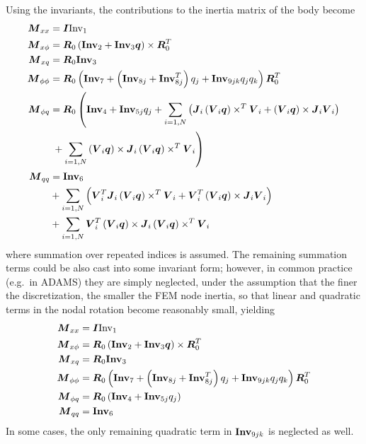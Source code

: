 Using the invariants, the contributions to the inertia matrix of the body
become
\begin{align}
	\boldsymbol{M}_{xx}	&= \boldsymbol{I} \mathrm{Inv}_1 \\
	\boldsymbol{M}_{x\phi}	&= \boldsymbol{R}_0 \left( 
		\boldsymbol{\mathrm{Inv}}_2 + \boldsymbol{\mathrm{Inv}}_3 \boldsymbol{q} \right)\times{}  \boldsymbol{R}_0^T \\
	\boldsymbol{M}_{xq}	&= \boldsymbol{R}_0 \boldsymbol{\mathrm{Inv}}_3 \\
	\boldsymbol{M}_{\phi\phi}&= \boldsymbol{R}_0 \left( 
		\boldsymbol{\mathrm{Inv}}_7
		+ \left( \boldsymbol{\mathrm{Inv}}_{8j} + \boldsymbol{\mathrm{Inv}}_{8j}^T \right) q_j
		+ \boldsymbol{\mathrm{Inv}}_{9jk} q_j q_k
	 \right) \boldsymbol{R}_0^T \\
	\boldsymbol{M}_{\phi q}	&= \boldsymbol{R}_0 \left( 
		\boldsymbol{\mathrm{Inv}}_4
		+ \boldsymbol{\mathrm{Inv}}_{5j} q_j 
		+ \sum_{i=1,N} \left( 
			\boldsymbol{J}_i \left( \boldsymbol{V}_i \boldsymbol{q} \right)\times^T \boldsymbol{V}_i
			+ \left( \boldsymbol{V}_i \boldsymbol{q} \right)\times \boldsymbol{J}_i \boldsymbol{V}_i
		 \right)
	 \right. \nonumber \\
			& \left.  \mbox{} + \sum_{i=1,N} \left( \boldsymbol{V}_i \boldsymbol{q} \right)\times \boldsymbol{J}_i \left( \boldsymbol{V}_i \boldsymbol{q} \right)\times^T \boldsymbol{V}_i
	 \right) \\
	\boldsymbol{M}_{qq}	&= \boldsymbol{\mathrm{Inv}}_6 \nonumber \\
			& \mbox{} + \sum_{i=1,N} \left( 
			\boldsymbol{V}_i^T \boldsymbol{J}_i \left( \boldsymbol{V}_i \boldsymbol{q} \right)\times^T \boldsymbol{V}_i
			+ \boldsymbol{V}_i^T \left( \boldsymbol{V}_i \boldsymbol{q} \right)\times \boldsymbol{J}_i \boldsymbol{V}_i
	 \right) \nonumber \\
			& \mbox{} + \sum_{i=1,N}
			\boldsymbol{V}_i^T \left( \boldsymbol{V}_i \boldsymbol{q} \right)\times \boldsymbol{J}_i \left( \boldsymbol{V}_i \boldsymbol{q} \right)\times^T \boldsymbol{V}_i
\end{align}
where summation over repeated indices is assumed.
The remaining summation terms could be also cast into some invariant form;
however, in common practice (e.g.\ in ADAMS) they are simply neglected,
under the assumption that the finer the discretization, the smaller 
the FEM node inertia, so that linear and quadratic terms 
in the nodal rotation become reasonably small, yielding
\begin{align}
	\boldsymbol{M}_{xx}	&= \boldsymbol{I} \mathrm{Inv}_1 \\
	\boldsymbol{M}_{x\phi}	&= \boldsymbol{R}_0 \left( 
		\boldsymbol{\mathrm{Inv}}_2 + \boldsymbol{\mathrm{Inv}}_3 \boldsymbol{q} \right)\times{}  \boldsymbol{R}_0^T \\
	\boldsymbol{M}_{xq}	&= \boldsymbol{R}_0 \boldsymbol{\mathrm{Inv}}_3 \\
	\boldsymbol{M}_{\phi\phi}&= \boldsymbol{R}_0 \left( 
		\boldsymbol{\mathrm{Inv}}_7
		+ \left( \boldsymbol{\mathrm{Inv}}_{8j} + \boldsymbol{\mathrm{Inv}}_{8j}^T \right) q_j
		+ \boldsymbol{\mathrm{Inv}}_{9jk} q_j q_k
	 \right) \boldsymbol{R}_0^T \\
	\boldsymbol{M}_{\phi q}	&= \boldsymbol{R}_0 \left( 
		\boldsymbol{\mathrm{Inv}}_4
		+ \boldsymbol{\mathrm{Inv}}_{5j} q_j 
	 \right) \\
	\boldsymbol{M}_{qq}	&= \boldsymbol{\mathrm{Inv}}_6 
\end{align}
In some cases, the only remaining quadratic term in $\boldsymbol{\mathrm{Inv}}_{9jk}$
is neglected as well.
